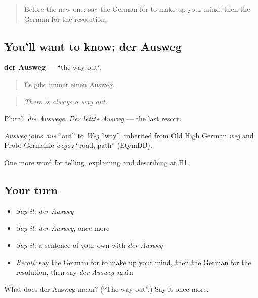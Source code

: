 \begin{quote}
Before the new one: say the German for to make up your mind, then the German for the resolution.
\end{quote}

\subsection*{You'll want to know: der Ausweg}
\textbf{der Ausweg} — \textquotedblleft{}the way out\textquotedblright{}.

\begin{quote}
Es gibt immer einen Ausweg.
\end{quote}

\begin{quote}
\emph{There is always a way out.}
\end{quote}

Plural: \emph{die Auswege}. \emph{Der letzte Ausweg} — the last resort.

\begin{cousinweb}
\emph{Ausweg} joins \emph{aus} \textquotedblleft{}out\textquotedblright{} to \emph{Weg} \textquotedblleft{}way\textquotedblright{}, inherited from Old High German \emph{weg} and Proto-Germanic \emph{wegaz} \textquotedblleft{}road, path\textquotedblright{} (EtymDB).
\end{cousinweb}

\begin{grammarlens}[title={What you've built}]
One more word for telling, explaining and describing at B1.
\end{grammarlens}

\subsection*{Your turn}
\begin{itemize}
\raggedright
  \item \emph{Say it:} \emph{der Ausweg}
  \item \emph{Say it:} \emph{der Ausweg}, once more
  \item \emph{Say it:} a sentence of your own with \emph{der Ausweg}
  \item \emph{Recall:} say the German for to make up your mind, then the German for the resolution, then say \emph{der Ausweg} again
\end{itemize}

\begin{tcolorbox}[breakable,colback=teal!4,colframe=teal!35!black,title={Before you move on}]
What does der Ausweg mean? (\textquotedblleft{}The way out\textquotedblright{}.) Say it once more.
\end{tcolorbox}
